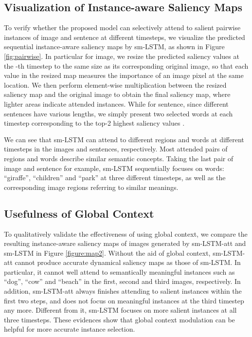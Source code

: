 \documentclass[10pt,twocolumn,letterpaper]{article}
\begin{document}
\subsection{Visualization of Instance-aware Saliency Maps}

To verify whether the proposed model can selectively attend to salient
pairwise instances of image and sentence at different timesteps,
we visualize the predicted sequential instance-aware saliency maps by sm-LSTM,
as shown in Figure \ref{fig:pairwise}.
In particular for image, we resize the predicted saliency values at the -th timestep
 to
the same size as its corresponding original image, so that
each value in the resized map measures the importance of an image pixel at the same location.
We then perform element-wise multiplication between the resized saliency map and the original image
to obtain the final saliency map, where lighter areas indicate attended instances.
While for sentence, since different sentences have various lengths,
we simply present two selected words at each timestep
corresponding to the top-2 highest saliency values .

We can see that sm-LSTM can attend to different regions and words
at different timesteps in the images and sentences, respectively.
Most attended pairs of regions and words describe similar semantic concepts.
Taking the last pair of image and sentence for example, sm-LSTM sequentially focuses on
words: ``giraffe'', ``children'' and ``park'' at three different timesteps,
as well as the corresponding image regions referring to similar meanings.







\subsection{Usefulness of Global Context} \label{sect:gc}

To qualitatively validate the effectiveness of using global context,
we compare the resulting instance-aware saliency maps of images
generated by sm-LSTM-att and sm-LSTM in Figure \ref{figure:map2}.
Without the aid of global context, sm-LSTM-att cannot produce
accurate dynamical saliency maps as those of sm-LSTM.
In particular, it cannot well attend to semantically meaningful instances
such as ``dog'', ``cow'' and ``beach'' in the first,
second and third images, respectively.
In addition, sm-LSTM-att always finishes attending to salient instances within the first two steps,
and does not focus on meaningful instances at the third timestep any more.
Different from it, sm-LSTM focuses on more salient instances at all three timesteps.
These evidences show that global context modulation
can be helpful for more accurate instance selection.
\end{document}
